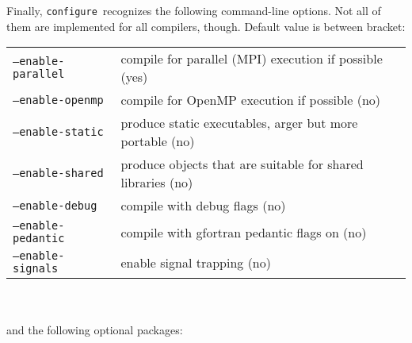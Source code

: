 \documentclass[12pt,a4paper]{article}
\def\configure{\texttt{configure}}
\begin{document}
Finally, \configure\ recognizes the following command-line options.
Not all of them are implemented for all compilers, though. Default value
is between bracket:\\
\begin{tabular}{ll}
\texttt{--enable-parallel}&     compile for parallel (MPI) execution if possible (yes)\\
\texttt{--enable-openmp}&       compile for OpenMP execution if possible (no)\\
\texttt{--enable-static}&       produce static executables, arger but more portable (no)\\
\texttt{--enable-shared}&       produce objects that are suitable for shared libraries (no)\\
\texttt{--enable-debug}&        compile with debug flags (no)\\
\texttt{--enable-pedantic}&     compile with gfortran pedantic flags on (no)\\
\texttt{--enable-signals}&      enable signal trapping (no)\\
\end{tabular}\\
\\
and the following optional packages:\\
\end{document}
